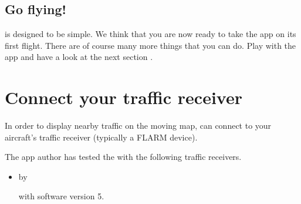 \documentclass[letterpaper,10pt,english]{sphinxmanual}
\begin{document}
\section{Go flying!}
\label{\detokenize{01-intro/03-firstFlight:go-flying}}
\sphinxAtStartPar
{} is designed to be simple.  We think that you are
now ready to take the app on its first flight.  There are of course many more
things that you can do.  Play with the app and have a look at the next section
{\hyperref[\detokenize{index:sec-steps}]{}}.


\chapter{Connect your traffic receiver}
\label{\detokenize{02-steps/traffic:connect-your-traffic-receiver}}\label{\detokenize{02-steps/traffic::doc}}
\sphinxAtStartPar
In order to display nearby traffic on the moving map,  can connect to your aircraft’s traffic receiver (typically a FLARM
device).

\sphinxAtStartPar
The app author has tested the  with the following
traffic receivers.
\begin{itemize}
\item {} 
\sphinxAtStartPar
{}%
\begin{footnote}[9]\sphinxAtStartFootnote
{}
%
\end{footnote} by %
\begin{footnote}[10]\sphinxAtStartFootnote
{}
%
\end{footnote} with software version 5.

\end{itemize}
\end{document}
